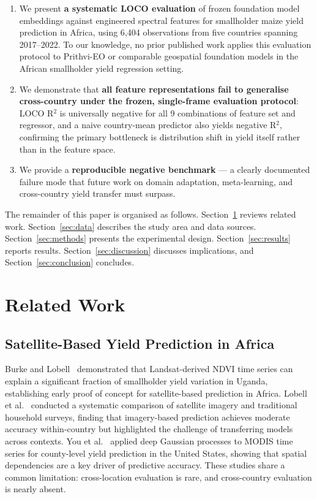 \documentclass[journal]{IEEEtran}
\begin{document}
\begin{enumerate}
  \item We present \textbf{a systematic LOCO evaluation} of frozen foundation
        model embeddings against engineered spectral features for smallholder
        maize yield prediction in Africa, using 6{,}404 observations from
        five countries spanning 2017--2022.
        To our knowledge, no prior published work applies this evaluation
        protocol to Prithvi-EO or comparable geospatial foundation models
        in the African smallholder yield regression setting.
  \item We demonstrate that \textbf{all feature representations fail to generalise
        cross-country under the frozen, single-frame evaluation protocol}:
        LOCO R$^2$ is universally negative for all 9 combinations
        of feature set and regressor, and a naive country-mean predictor also
        yields negative R$^2$, confirming the primary bottleneck is distribution
        shift in yield itself rather than in the feature space.
  \item We provide a \textbf{reproducible negative benchmark} — a clearly documented
        failure mode that future work on domain adaptation,
        meta-learning, and cross-country yield transfer must surpass.
\end{enumerate}

The remainder of this paper is organised as follows.
Section~\ref{sec:related} reviews related work.
Section~\ref{sec:data} describes the study area and data sources.
Section~\ref{sec:methods} presents the experimental design.
Section~\ref{sec:results} reports results.
Section~\ref{sec:discussion} discusses implications, and
Section~\ref{sec:conclusion} concludes.

\section{Related Work}
\label{sec:related}

\subsection{Satellite-Based Yield Prediction in Africa}

Burke and Lobell~\cite{burke2017sat} demonstrated that Landsat-derived NDVI time
series can explain a significant fraction of smallholder yield variation in
Uganda, establishing early proof of concept for satellite-based prediction in Africa.
Lobell et al.~\cite{lobell2020eyes} conducted a systematic comparison of
satellite imagery and traditional household surveys, finding that
imagery-based prediction achieves moderate accuracy within-country but
highlighted the challenge of transferring models across contexts.
You et al.~\cite{you2017deep} applied deep Gaussian processes to MODIS time
series for county-level yield prediction in the United States, showing that
spatial dependencies are a key driver of predictive accuracy.
These studies share a common limitation: cross-location evaluation is rare,
and cross-country evaluation is nearly absent.
\end{document}
